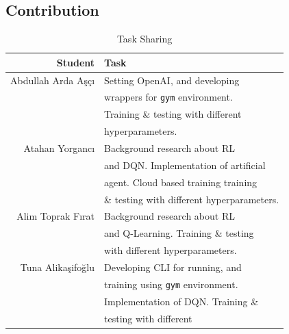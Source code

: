 \begin{appendices}
    \onecolumn
    \section{Contribution}\label{app:contrib}
    \begin{table}[h]
        \centering
        \caption{Task Sharing}\label{tab:task_sharing}
        \begin{tabular}{rl}\toprule
            \textbf{Student}   & \textbf{Task}                              \\\midrule
            Abdullah Arda Aşçı & Setting OpenAI, and developing             \\
                               & wrappers for \texttt{gym} environment.     \\
                               & Training \& testing with different         \\
                               & hyperparameters.                           \\
            \midrule
            Atahan Yorgancı    & Background research about RL               \\
                               & and DQN\@. Implementation of artificial    \\
                               & agent. Cloud based training training       \\
                               & \& testing with different hyperparameters. \\
            \midrule
            Alim Toprak Fırat  & Background research about RL               \\
                               & and Q-Learning. Training \& testing        \\
                               & with different hyperparameters.            \\
            \midrule
            Tuna Alikaşifoğlu  & Developing CLI for running, and            \\
                               & training using \texttt{gym} environment.   \\
                               & Implementation of DQN\@. Training \&       \\
                               & testing with different                     \\ \bottomrule
        \end{tabular}
    \end{table}


\end{appendices}
